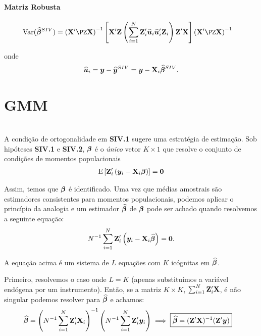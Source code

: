 \documentclass[11pt, oneside, a4paper, article]{article}
\numberwithin{equation}{section}
\begin{document}
\begin{description}
\paragraph{Matriz Robusta}

\begin{align*}
\Var(\betavechat^{SIV}) &= 
\left( \Xmat' \PZ \Xmat \right)^{-1}
\left[ \Xmat'\Zmat 
	\left( \sum_{i=1}^{N} \Zmat_{i}' \uvechat_{i} \uvechat_{i}' \Zmat_{i} \right)	
\Zmat'\Xmat \right]
\left( \Xmat' \PZ \Xmat \right)^{-1}
\end{align*}

\noindent
onde
\begin{align*}
	\widehat{\boldsymbol{u}}_{i} = \boldsymbol{y} - \widehat{\boldsymbol{y}}^{SIV} = \boldsymbol{y} - \mathbf{X}_{i} \widehat{\boldsymbol{\beta}}^{SIV}.
\end{align*}

\clearpage
\section{GMM}
\noindent
\citet[Sec 8.3, p.188]{wool-2010} \\

A condição de ortogonalidade em \textbf{SIV.1} sugere uma estratégia de estimação.
Sob hipóteses \textbf{SIV.1} e \textbf{SIV.2}, $\boldsymbol{\beta}$ é o \emph{único} vetor $K \times 1$ que resolve o conjunto de condições de momentos populacionais
\begin{align*}
	\text{E}\left[ \mathbf{Z}_{i}' \left( \boldsymbol{y}_{i} - \mathbf{X}_{i} \boldsymbol{\beta} \right) \right] = \boldsymbol{0}
\end{align*}

Assim, temos que $\boldsymbol{\beta}$ é identificado.
Uma vez que médias amostrais são estimadores consistentes para momentos populacionais, podemos aplicar o princípio da analogia e um estimador $\widehat{\boldsymbol{\beta}}$ de $\boldsymbol{\beta}$ pode ser achado quando resolvemos a seguinte equação:
\begin{align}\label{gmm:cond}
N^{-1} \sum_{i=1}^{N} \mathbf{Z}_{i}' \left( \boldsymbol{y}_{i} - \mathbf{X}_{i} \widehat{\boldsymbol{\beta}} \right) = \boldsymbol{0}.
\end{align}

\noindent
A equação acima é um sistema de $L$ equações com $K$ icógnitas em $\widehat{\boldsymbol{\beta}}$.

Primeiro, resolvemos o caso onde $L = K$ (apenas substituímos a variável endógena por um instrumento).
Então, se a matriz $K \times K$, $\sum_{i=1}^{N}\mathbf{Z}_{i}' \mathbf{X}$, é não singular podemos resolver para $\widehat{\boldsymbol{\beta}}$ e achamos:
\begin{align*}
\widehat{\boldsymbol{\beta}} &=
\left( N^{-1} \sum_{i=1}^{N} \mathbf{Z}_{i}^{\prime} \mathbf{X}_{i} \right)^{-1}
\left( N^{-1} \sum_{i=1}^{N} \mathbf{Z}_{i}^{\prime} \boldsymbol{y}_{i} \right)
\implies
\boxed{\widehat{\boldsymbol{\beta}} = ( \mathbf{Z}' \mathbf{X} )^{-1} ( \mathbf{Z}^{\prime} \boldsymbol{y} ) }
\end{align*}


\end{description}
\end{document}

